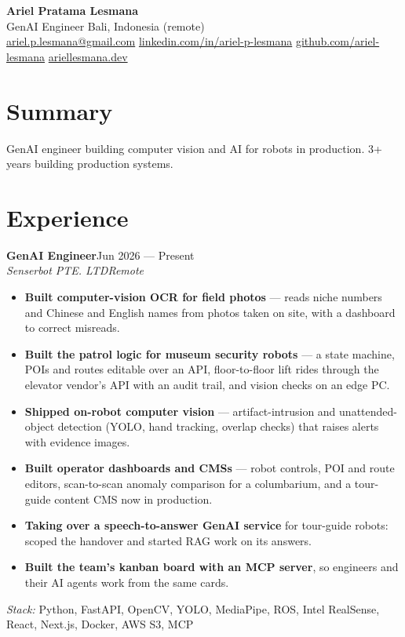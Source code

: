 \documentclass[10pt]{article}
\newcommand{\entry}[4]{\textbf{#1}\hfill #2\\\textit{#3}\hfill\textit{#4}\par}
\begin{document}
\begin{center}
{\LARGE\bfseries Ariel Pratama Lesmana}\\[4pt]
GenAI Engineer \textbullet{} Bali, Indonesia (remote)\\[2pt]
\href{mailto:ariel.p.lesmana@gmail.com}{ariel.p.lesmana@gmail.com} \textbar{} \href{https://linkedin.com/in/ariel-p-lesmana}{linkedin.com/in/ariel-p-lesmana} \textbar{} \href{https://github.com/ariel-lesmana}{github.com/ariel-lesmana} \textbar{} \href{https://www.ariellesmana.dev}{ariellesmana.dev}
\end{center}

\section{Summary}
GenAI engineer building computer vision and AI for robots in production. 3+ years building production systems.

\section{Experience}
\entry{GenAI Engineer}{Jun 2026 — Present}{Senserbot PTE. LTD}{Remote}
\begin{itemize}
  \item \textbf{Built computer-vision OCR for field photos} — reads niche numbers and Chinese and English names from photos taken on site, with a dashboard to correct misreads.
  \item \textbf{Built the patrol logic for museum security robots} — a state machine, POIs and routes editable over an API, floor-to-floor lift rides through the elevator vendor's API with an audit trail, and vision checks on an edge PC.
  \item \textbf{Shipped on-robot computer vision} — artifact-intrusion and unattended-object detection (YOLO, hand tracking, overlap checks) that raises alerts with evidence images.
  \item \textbf{Built operator dashboards and CMSs} — robot controls, POI and route editors, scan-to-scan anomaly comparison for a columbarium, and a tour-guide content CMS now in production.
  \item \textbf{Taking over a speech-to-answer GenAI service} for tour-guide robots: scoped the handover and started RAG work on its answers.
  \item \textbf{Built the team's kanban board with an MCP server}, so engineers and their AI agents work from the same cards.
\end{itemize}
{\small\textit{Stack:} Python, FastAPI, OpenCV, YOLO, MediaPipe, ROS, Intel RealSense, React, Next.js, Docker, AWS S3, MCP}\par\medskip
\end{document}
